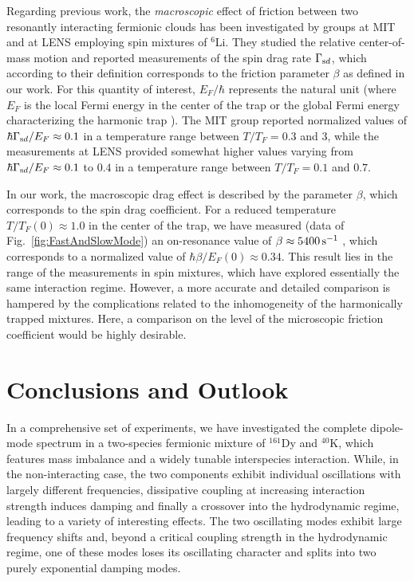 Regarding previous work, the {\em macroscopic} effect of friction between two resonantly interacting fermionic clouds has been investigated by groups at MIT \cite{Sommer2011ust} and at LENS \cite{Valtolina2017etf} employing spin mixtures of $^6$Li. They studied the relative center-of-mass motion and reported measurements of the spin drag rate $\Gamma_{\textrm sd}$, which according to their definition corresponds to the friction parameter $\beta$ as defined in our work.
For this quantity of interest, $E_F/\hbar$ represents the natural unit (where $E_F$ is the local Fermi energy in the center of the trap \cite{Sommer2011ust} or the global Fermi energy characterizing the harmonic trap \cite{Valtolina2017etf}). The MIT group reported normalized values of $\hbar \Gamma_{\textrm sd}/E_F \approx 0.1$ in a temperature range between $T/T_F = 0.3$ and $3$, while the measurements at LENS provided somewhat higher values varying from $\hbar \Gamma_{\textrm sd}/E_F \approx 0.1$ to $0.4$ in a temperature range between $T/T_F = 0.1$ and $0.7$.

In our work, the macroscopic drag effect is described by the parameter $\beta$, which corresponds to the spin drag coefficient. For a reduced temperature $T/{T}_F(0) \approx 1.0$ in the center of the trap, we have measured (data of Fig.~\ref{fig:FastAndSlowMode}) an on-resonance value of $\beta \approx 5400\,{\textrm s}^{-1}$ , which corresponds to a normalized value of $\hbar \beta/{E}_{F}(0) \approx 0.34$. This result lies in the range of the measurements in spin mixtures, which have explored essentially the same interaction regime. However, a more accurate and detailed comparison is hampered by the complications related to the inhomogeneity of the harmonically trapped mixtures. Here, a comparison on the level of the microscopic friction coefficient would be highly desirable.


\section{Conclusions and Outlook}\label{sec:conclusion}

In a comprehensive set of experiments, we have investigated the complete dipole-mode spectrum in a two-species fermionic mixture of $^{161}$Dy and $^{40}$K, which features mass imbalance and a widely tunable interspecies interaction. 
While, in the non-interacting case, the two components exhibit individual oscillations with largely different frequencies, dissipative coupling at increasing interaction strength induces damping and finally a crossover into the hydrodynamic regime, leading to a variety of interesting effects. The two oscillating modes exhibit large frequency shifts and, beyond a critical coupling strength in the hydrodynamic regime, one of these modes loses its oscillating character and splits into two purely exponential damping modes.

